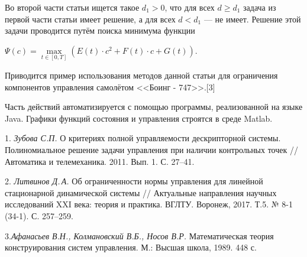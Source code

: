 Во второй части статьи ищется такое $d_{1}>0$, что для всех $d\geqslant d_{1}$ задача из первой части статьи имеет решение, а для всех $d<d_{1}$ --- не имеет. Решение этой задачи проводится путём поиска минимума функции

$\Psi (c)=\max\limits_{t\in[0,T]}(E(t)\cdot c^{2}+F(t)\cdot c+G(t))$.

Приводится пример использования методов данной статьи для ограничения  компонентов управления самолётом <<Боинг - 747>>.[3]

Часть действий автоматизируется с помощью программы, реализованной на языке Java.
Графики функций состояния и уп\-ра\-в\-ле\-ния строятся в среде Matlab.

\litlist

1. {\it Зубова С.П.} О критериях полной управляемости дескрипторной системы. Полиномиальное решение задачи управления при наличии контрольных точек // Автоматика и телемеханика. 2011. Вып. 1. С. 27--41.

2. {\it Литвинов Д.\,А.}
Об ограниченности нормы управления для линейной стационарной динамической системы
//
Актуальные направления научных исследований XXI века: теория и практика. ВГЛТУ. Воронеж, 2017. Т.5. № 8-1 (34-1). С. 257--259.

3.{\it Афанасьев В.Н., Колмановский В.Б., Носов В.Р. } Математическая теория конструирования систем управления. М.: Высшая школа, 1989. 448 с.


